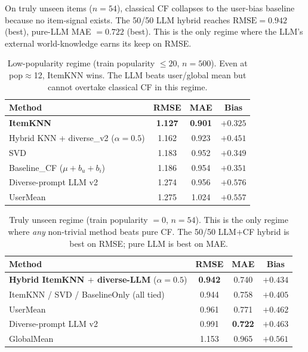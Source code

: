 \documentclass[11pt,a4paper]{article}
\newcommand{\best}[1]{\textcolor{goodgreen}{\textbf{#1}}}
\begin{document}
On truly unseen items ($n{=}54$), classical CF collapses to the user-bias
baseline because no item-signal exists. The 50/50 LLM hybrid reaches
$\text{RMSE}=0.942$ (best), pure-LLM MAE $=0.722$ (best). This is the only
regime where the LLM's external world-knowledge earns its keep on RMSE.

\begin{table}[H]
\centering
\small
\caption{Low-popularity regime (train popularity $\leq 20$, $n{=}500$).
Even at pop$\approx$12, ItemKNN wins. The LLM beats user/global mean but
cannot overtake classical CF in this regime.}
\label{tab:cold20}
\begin{tabular}{lccc}
\toprule
Method & RMSE & MAE & Bias \\ \midrule
\textbf{ItemKNN}                                   & \best{1.127} & \best{0.901} & $+0.325$ \\
Hybrid KNN + diverse\_v2 ($\alpha{=}0.5$)          & 1.162        & 0.923        & $+0.451$ \\
SVD                                                & 1.183        & 0.952        & $+0.349$ \\
Baseline\_CF ($\mu{+}b_u{+}b_i$)                   & 1.186        & 0.954        & $+0.351$ \\
Diverse-prompt LLM v2                              & 1.274        & 0.956        & $+0.576$ \\
UserMean                                           & 1.275        & 1.024        & $+0.557$ \\
\bottomrule
\end{tabular}
\end{table}

\begin{table}[H]
\centering
\small
\caption{Truly unseen regime (train popularity $=0$, $n{=}54$). This is
the only regime where \emph{any} non-trivial method beats pure CF. The
50/50 LLM$+$CF hybrid is best on RMSE; pure LLM is best on MAE.}
\label{tab:cold0}
\begin{tabular}{lccc}
\toprule
Method & RMSE & MAE & Bias \\ \midrule
\textbf{Hybrid ItemKNN $+$ diverse-LLM} ($\alpha{=}0.5$) & \best{0.942} & 0.740 & $+0.434$ \\
ItemKNN / SVD / BaselineOnly (all tied)                   & 0.944        & 0.758 & $+0.405$ \\
UserMean                                                    & 0.961        & 0.771 & $+0.462$ \\
Diverse-prompt LLM v2                                      & 0.991        & \best{0.722} & $+0.463$ \\
GlobalMean                                                  & 1.153        & 0.965 & $+0.561$ \\
\bottomrule
\end{tabular}
\end{table}
\end{document}
